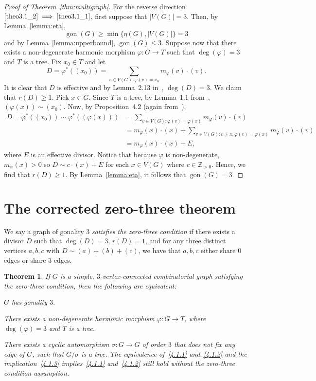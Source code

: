 \documentclass[10pt]{amsart}
\newtheorem{theorem}{Theorem}[section]
\newenvironment{theo}{\begin{theorem}}{\end{theorem}}
\renewenvironment{enumerate}[1][]{\if\relax\detokenize{#1}\relax\sourceenumerate\else\sourceenumerate[label=#1]\fi}{\endsourceenumerate}
\DeclareMathOperator{\gon}{gon}
\begin{document}
\begin{proof}[Proof of Theorem~\ref{thm:multigraph}]
For the reverse direction $\eqref{theo3.1_2} \implies \eqref{theo3.1_1}$, first suppose that $|V(G)| = 3$. Then, by Lemma~\ref{lemma:eta}, $$\gon (G) \geq \min \{ \eta(G), |V(G)| \} = 3$$ and by Lemma~\ref{lemma:upperbound}, $\gon (G) \leq 3$. Suppose now that there exists a non-degenerate harmonic morphism $\varphi : G \to T$ such that $\deg (\varphi) = 3$ and $T$ is a tree. Fix $x_0 \in T$ and let 
 \[
 D = \varphi^*((x_0)) = \sum_{v \in V(G) : \varphi(v) = x_0} m_\varphi(v) \cdot (v).
 \]
 It is clear that $D$ is effective and by Lemma~2.13 in~\cite{bn2}, $\deg (D) = 3$. We claim that $r(D) \geq 1$. Pick $x \in G$. Since $T$ is a tree, by Lemma~1.1 from~\cite{bn2}, $(\varphi(x)) \sim (x_0)$. Now, by Proposition~4.2 (again from~\cite{bn2}), 
 \begin{align*}
 D = \varphi^*((x_0)) \sim \varphi^*((\varphi(x))) &= \sum_{v \in V(G) : \varphi(v) = \varphi(x)} m_\varphi(v) \cdot (v) \\
 &= m_\varphi(x) \cdot (x) + \sum_{v \in V(G) : v \neq x, \varphi(v) = \varphi(x)} m_\varphi(v) \cdot (v) \\
 &= m_\varphi(x) \cdot (x) + E,
 \end{align*}
 where $E$ is an effective divisor. Notice that because $\varphi$ is non-degenerate, $m_\varphi(x) > 0$ so $D \sim c \cdot (x) + E$ for each $x \in V(G)$ where $c \in \mathbb{Z}_{>0}$. Hence, we find that $r(D) \geq 1$. By Lemma~\ref{lemma:eta}, it follows that $\gon (G) = 3$.
\end{proof}
\setcounter{section}{3}
\section{The corrected zero-three theorem}
We say a graph of gonality $3$ \emph{satisfies the zero-three condition} if there exists a divisor $D$ such that $\deg(D)=3$, $r(D)=1$, and for any three distinct vertices $a,b,c$ with $D\sim (a)+(b)+(c)$, we have that $a,b,c$ either share $0$ edges or share $3$ edges.
\begin{theo}\label{thm:simpletheorem}
If $G$ is a simple, $3$-vertex-connected combinatorial graph satisfying the zero-three condition, then the following are equivalent:
\begin{enumerate}
\item \label{4.1.1} $G$ has gonality $3$.
\item \label{4.1.2} There exists a non-degenerate harmonic morphism $\varphi : G \to T$, where $\deg(\varphi) = 3$ and $T$ is a tree.
\item \label{4.1.3} There exists a cyclic automorphism $\sigma: G \to G$ of order $3$ that does not fix any edge of $G$, such that $G/\sigma$ is a tree.
\end{enumerate}
The equivalence of~\eqref{4.1.1} and~\eqref{4.1.2} and the implication~\eqref{4.1.3} implies~\eqref{4.1.1} and~\eqref{4.1.2} still hold without the zero-three condition assumption.
\end{theo}
\end{document}
